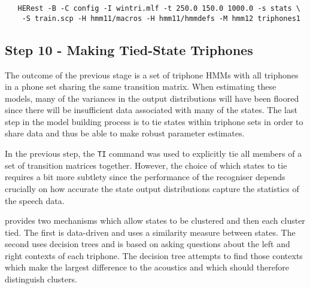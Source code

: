 \begin{verbatim}
   HERest -B -C config -I wintri.mlf -t 250.0 150.0 1000.0 -s stats \
    -S train.scp -H hmm11/macros -H hmm11/hmmdefs -M hmm12 triphones1
\end{verbatim}


\subsection{Step 10 - Making Tied-State Triphones}

The outcome of the previous stage is a set of triphone HMMs with all triphones
in a phone set sharing the same transition matrix.  When estimating these
models, many of the variances in the output distributions
will have been floored since there will be
\index{tying!states}\index{data insufficiency}
insufficient data associated with many of the states.  The last step in
the model building process is to tie states within triphone sets
in order to share data and thus be able to make robust parameter estimates.

In the previous step, the \texttt{TI} command was used to
explicitly tie all members of a set of transition matrices together. 
However,
the choice of which states to tie requires a bit more  subtlety since
the performance of the recogniser depends crucially on how accurate
the state output distributions capture the statistics of the speech data.

 provides two mechanisms which allow states to be clustered 
and\index{state clustering}
then each cluster tied.  The first is data-driven and uses a similarity
measure between states.  The second uses decision trees
and is based on asking questions about the left and right contexts of each
triphone.  The decision tree attempts to find those contexts which make the largest
difference to the acoustics and which should therefore distinguish clusters.


